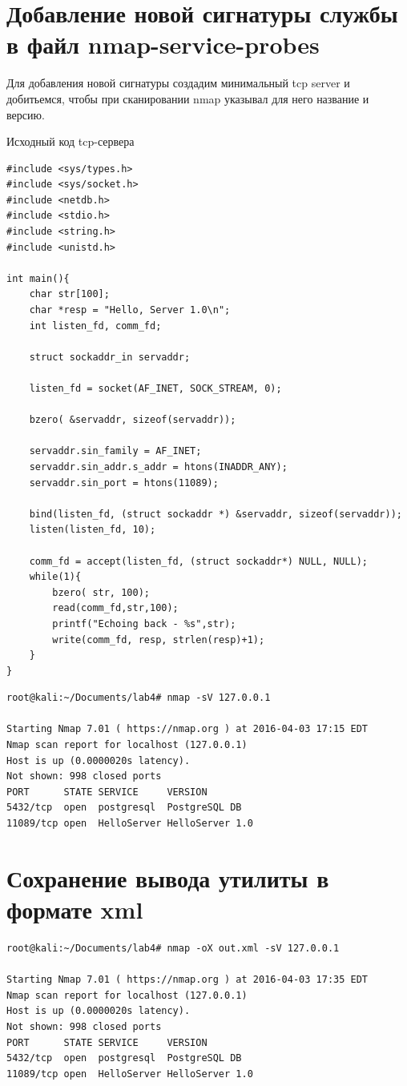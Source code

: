 \documentclass[12pt,a4paper]{report}
\begin{document}
\section*{Добавление новой сигнатуры службы в файл nmap-service-probes}

Для добавления новой сигнатуры создадим минимальный tcp server и добитьемся, чтобы при сканировании nmap указывал для него название и версию.

Исходный код tcp-сервера

\begin{lstlisting}[breaklines]
#include <sys/types.h>
#include <sys/socket.h>
#include <netdb.h>
#include <stdio.h>
#include <string.h>
#include <unistd.h>
 
int main(){
    char str[100];
	char *resp = "Hello, Server 1.0\n";
    int listen_fd, comm_fd;
 
    struct sockaddr_in servaddr;
 
    listen_fd = socket(AF_INET, SOCK_STREAM, 0);
 
    bzero( &servaddr, sizeof(servaddr));
 
    servaddr.sin_family = AF_INET;
    servaddr.sin_addr.s_addr = htons(INADDR_ANY);
    servaddr.sin_port = htons(11089);
 
    bind(listen_fd, (struct sockaddr *) &servaddr, sizeof(servaddr)); 
    listen(listen_fd, 10); 

    comm_fd = accept(listen_fd, (struct sockaddr*) NULL, NULL); 
    while(1){ 
        bzero( str, 100); 
        read(comm_fd,str,100); 
        printf("Echoing back - %s",str); 
        write(comm_fd, resp, strlen(resp)+1); 
    }
}
\end{lstlisting}

\begin{lstlisting}[breaklines]
root@kali:~/Documents/lab4# nmap -sV 127.0.0.1

Starting Nmap 7.01 ( https://nmap.org ) at 2016-04-03 17:15 EDT
Nmap scan report for localhost (127.0.0.1)
Host is up (0.0000020s latency).
Not shown: 998 closed ports
PORT      STATE SERVICE     VERSION
5432/tcp  open  postgresql  PostgreSQL DB
11089/tcp open  HelloServer HelloServer 1.0
\end{lstlisting}

\section*{Сохранение вывода утилиты в формате xml}

\begin{lstlisting}[breaklines]
root@kali:~/Documents/lab4# nmap -oX out.xml -sV 127.0.0.1

Starting Nmap 7.01 ( https://nmap.org ) at 2016-04-03 17:35 EDT
Nmap scan report for localhost (127.0.0.1)
Host is up (0.0000020s latency).
Not shown: 998 closed ports
PORT      STATE SERVICE     VERSION
5432/tcp  open  postgresql  PostgreSQL DB
11089/tcp open  HelloServer HelloServer 1.0
\end{lstlisting}
\end{document}
